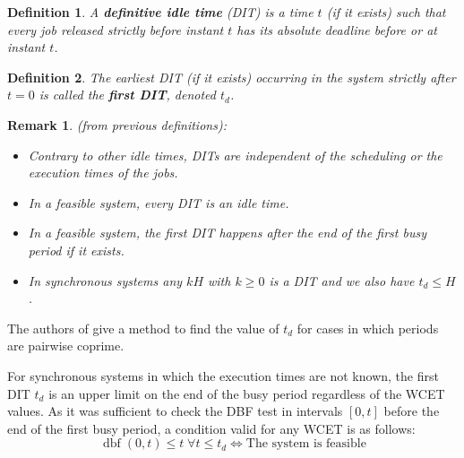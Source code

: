\documentclass[conference]{IEEEtran}
\newtheorem{definition}{Definition}
\newtheorem{remark}{Remark}
\newcommand{\dbf}[1]{\operatorname{dbf}(#1)}
\begin{document}
  \begin{definition}
    A \textbf{definitive idle time} (DIT) \cite{lipariaverage} is a time $t$ (if it exists) such that every job
    released strictly before instant $t$ has its absolute deadline before or at instant $t$.
  \end{definition}

  \begin{definition}
    The earliest DIT (if it exists) occurring in the system strictly after $t=0$ is called the
    \textbf{first DIT}, denoted $t_d$.
  \end{definition}

		\begin{remark} (from previous definitions):
			\begin{itemize}
				\item Contrary to other idle times, DITs are independent of the
					scheduling or the execution times of the jobs.
				\item In a feasible system, every DIT is an idle time.
				\item In a feasible system, the first DIT happens after the end of the
					first busy period if it exists.
				\item In synchronous systems any $kH$ with $k \geqslant 0$ is a DIT and we
					also have $t_d \leqslant H$.
			\end{itemize}
		\end{remark}

  The authors of \cite{george2009characterization} give a method to find the value of $t_d$ for cases in which periods are pairwise coprime.

  For synchronous systems in which the execution times are not known, the first DIT $t_d$
  is an upper limit on the end of the busy period regardless of the WCET values. As it was sufficient
  to check the DBF test in intervals $[0, t]$ before the end of the first busy period, a condition valid for any WCET is as follows:
  \begin{equation}
  		\dbf{0,t} \leqslant t \; \forall t \leqslant t_d
  		\iff \text{The system is feasible}
  \end{equation}
\end{document}
